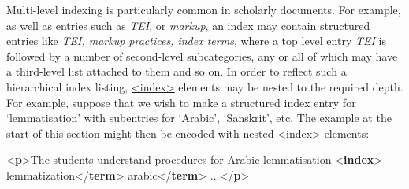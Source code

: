 Multi-level indexing is particularly common in scholarly documents. For example, as well as entries such as \textit{TEI}, or \textit{markup}, an index may contain structured entries like \textit{TEI, markup practices, index terms}, where a top level entry \textit{TEI} is followed by a number of second-level subcategories, any or all of which may have a third-level list attached to them and so on. In order to reflect such a hierarchical index listing, \hyperref[TEI.index]{<index>} elements may be nested to the required depth. For example, suppose that we wish to make a structured index entry for ‘lemmatisation’ with subentries for ‘Arabic’, ‘Sanskrit’, etc. The example at the start of this section might then be encoded with nested \hyperref[TEI.index]{<index>} elements: \par\bgroup{}\exampleFont \begin{shaded}\noindent\mbox{}{<\textbf{p}>}The students understand procedures for Arabic lemmatisation\mbox{}\newline 
{<\textbf{index}>}\mbox{}\newline 
\hspace*{1em}lemmatization{</\textbf{term}>}\mbox{}\newline 
\hspace*{1em}\mbox{}\newline 
\hspace*{1em}\hspace*{1em}arabic{</\textbf{term}>}\mbox{}\newline 
\hspace*{1em}\mbox{}\newline 
{}\mbox{}\newline 
 ...{</\textbf{p}>}\end{shaded}\egroup\par \par
